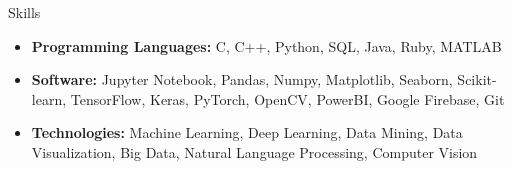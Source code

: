 \documentclass[]{../mcdowellcv}
\begin{document}
\begin{cvsection}{Skills}

    \begin{cvsubsection}{}{}{}
        \begin{itemize}
            \item \textbf{Programming Languages:} C, C++, Python, SQL, Java, Ruby, MATLAB
            \item \textbf{Software:} Jupyter Notebook, Pandas, Numpy, Matplotlib, Seaborn, Scikit-learn, TensorFlow, Keras, PyTorch, OpenCV, PowerBI, Google Firebase, Git
            \item \textbf{Technologies:} Machine Learning, Deep Learning, Data Mining, Data Visualization, Big Data, Natural Language Processing, Computer Vision
        \end{itemize}
    \end{cvsubsection}

\end{cvsection}
\end{document}
